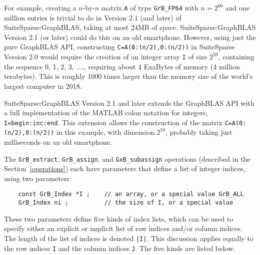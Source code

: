 \documentclass[12pt]{article}
\begin{document}
For example, creating a $n$-by-$n$ matrix \verb'A' of type \verb'GrB_FP64' with
$n=2^{60}$ and one million entries is trivial to do in Version 2.1 (and later)
of SuiteSparse:GraphBLAS, taking at most 24MB of space.  SuiteSparse:GraphBLAS
Version 2.1 (or later) could do this on an old smartphone.  However, using just
the pure GraphBLAS API, constructing \verb'C=A(0:(n/2),0:(n/2))'
in SuiteSparse Version 2.0 would require the creation of an integer array
\verb'I' of size $2^{59}$, containing the sequence 0, 1, 2, 3, ...., requiring
about 4 ExaBytes of memory (4 million terabytes).  This is roughly 1000 times
larger than the memory size of the world's largest computer in 2018.

SuiteSparse:GraphBLAS Version 2.1 and later extends the GraphBLAS API with a
full implementation of the MATLAB colon notation for integers,
\verb'I=begin:inc:end'.  This extension allows the construction of the matrix
\verb'C=A(0:(n/2),0:(n/2))' in this example, with dimension $2^{59}$, probably
taking just milliseconds on an old smartphone.

The \verb'GrB_extract', \verb'GrB_assign', and \verb'GxB_subassign' operations
(described in the Section~\ref{operations}) each have parameters that define a
list of integer indices, using two parameters:

    {\footnotesize
    \begin{verbatim}
    const GrB_Index *I ;    // an array, or a special value GrB_ALL
    GrB_Index ni ;          // the size of I, or a special value \end{verbatim}}

These two parameters define five kinds of index lists, which can be used to
specify either an explicit or implicit list of row indices and/or column
indices.  The length of the list of indices is denoted \verb'|I|'.  This
discussion applies equally to the row indices \verb'I' and the column indices
\verb'J'.  The five kinds are listed below.
\end{document}
